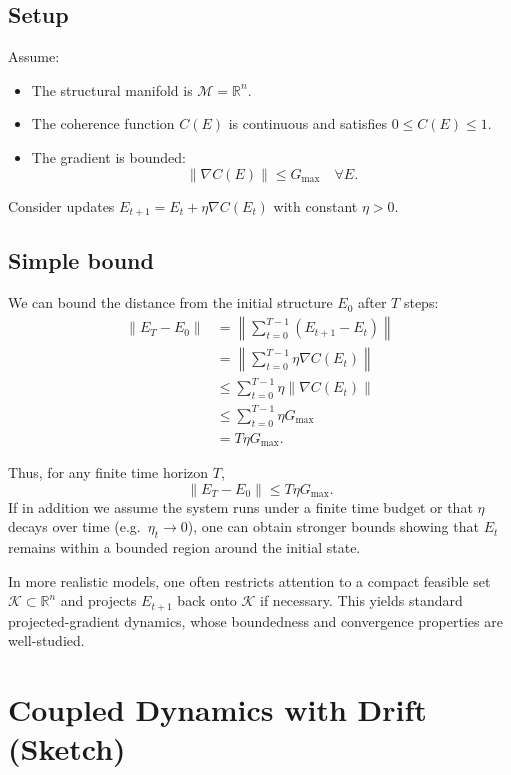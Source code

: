 \documentclass[12pt,a4paper]{report}
\begin{document}
\subsection*{Setup}

Assume:
\begin{itemize}[leftmargin=2em]
    \item The structural manifold is \(\mathcal{M} = \mathbb{R}^n\).
    \item The coherence function \(C(E)\) is continuous and satisfies \(0 \le C(E) \le 1\).
    \item The gradient is bounded:
    \[
        \|\nabla C(E)\| \le G_{\max} \quad \forall E.
    \]
\end{itemize}

Consider updates \(E_{t+1} = E_t + \eta \nabla C(E_t)\) with constant \(\eta > 0\).

\subsection*{Simple bound}

We can bound the distance from the initial structure \(E_0\) after \(T\) steps:
\begin{align}
    \|E_T - E_0\|
    &= \left\| \sum_{t=0}^{T-1} (E_{t+1} - E_t) \right\| \\
    &= \left\| \sum_{t=0}^{T-1} \eta \nabla C(E_t) \right\| \\
    &\le \sum_{t=0}^{T-1} \eta \|\nabla C(E_t)\| \\
    &\le \sum_{t=0}^{T-1} \eta G_{\max} \\
    &= T \eta G_{\max}.
\end{align}

Thus, for any finite time horizon \(T\),
\begin{equation}
    \|E_T - E_0\| \le T \eta G_{\max}.
\end{equation}
If in addition we assume the system runs under a finite time budget or that \(\eta\) decays over time (e.g.\ \(\eta_t \to 0\)), one can obtain stronger bounds showing that \(E_t\) remains within a bounded region around the initial state.

In more realistic models, one often restricts attention to a compact feasible set \(\mathcal{K} \subset \mathbb{R}^n\) and projects \(E_{t+1}\) back onto \(\mathcal{K}\) if necessary. This yields standard projected-gradient dynamics, whose boundedness and convergence properties are well-studied.

\section{Coupled Dynamics with Drift (Sketch)}
\end{document}
